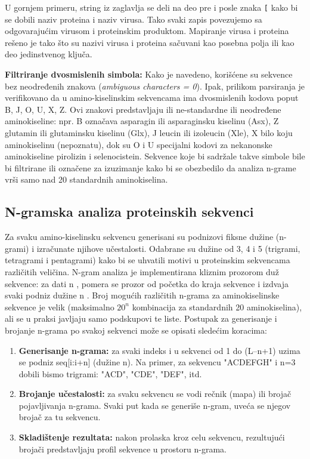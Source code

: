 \documentclass[a4paper,12pt]{article}
\begin{document}
U gornjem primeru, string iz zaglavlja se deli na deo pre i posle znaka \texttt{[} kako bi se dobili naziv proteina i
naziv virusa. Tako svaki zapis povezujemo sa odgovarajućim virusom i proteinskim produktom. Mapiranje
virusa i proteina rešeno je tako što su nazivi virusa i proteina sačuvani kao posebna polja ili kao deo
jedinstvenog ključa. 

\vspace{10pt}
\textbf{Filtriranje dvosmislenih simbola:} Kako je navedeno, korišćene su sekvence bez neodređenih znakova
(\textit{ambiguous characters = 0}). Ipak, prilikom parsiranja je verifikovano da u amino-kiselinskim sekvencama
ima dvosmislenih kodova poput B, J, O, U, X, Z. Ovi znakovi predstavljaju ili ne-standardne ili neodređene
aminokiseline: npr. B označava asparagin ili asparaginsku kiselinu (Asx), Z glutamin ili glutaminsku kiselinu
(Glx), J leucin ili izoleucin (Xle), X bilo koju aminokiselinu (nepoznatu), dok su O i U specijalni kodovi za
nekanonske aminokiseline pirolizin i selenocistein. Sekvence koje bi sadržale takve simbole bile bi
filtrirane ili označene za izuzimanje kako bi se obezbedilo da analiza n-grame vrši samo nad 20 standardnih
aminokiselina. 

\subsection{N-gramska analiza proteinskih sekvenci}

Za svaku amino-kiselinsku sekvencu generisani su podnizovi
fiksne dužine (n-grami) i izračunate njihove učestalosti. Odabrane su dužine od 3, 4 i 5 (trigrami, tetragrami i
pentagrami) kako bi se uhvatili motivi u proteinskim sekvencama različitih veličina. N-gram analiza je
implementirana kliznim prozorom duž sekvence: za dati n , pomera se prozor od početka do kraja
sekvence i izdvaja svaki podniz dužine n . Broj mogućih različitih n-grama za aminokiselinske sekvence je
velik (maksimalno $20^n$ kombinacija za standardnih 20 aminokiselina), ali se u praksi javljaju samo
podskupovi te liste. Postupak za generisanje i brojanje n-grama po svakoj sekvenci može se opisati sledećim
koracima:

\begin{enumerate}
  \item \textbf{Generisanje n-grama:} za svaki indeks i u sekvenci od 1 do (L–n+1) uzima se podniz seq[i:i+n]
(dužine n). Na primer, za sekvencu "ACDEFGH" i n=3 dobili bismo trigrami: "ACD", "CDE", "DEF",
itd.
  \item \textbf{Brojanje učestalosti:} za svaku sekvencu se vodi rečnik (mapa) ili brojač pojavljivanja n-grama. Svaki
put kada se generiše n-gram, uveća se njegov brojač za tu sekvencu.
  \item \textbf{Skladištenje rezultata:} nakon prolaska kroz celu sekvencu, rezultujući brojači predstavljaju profil
sekvence u prostoru n-grama.
\end{enumerate}
\end{document}
